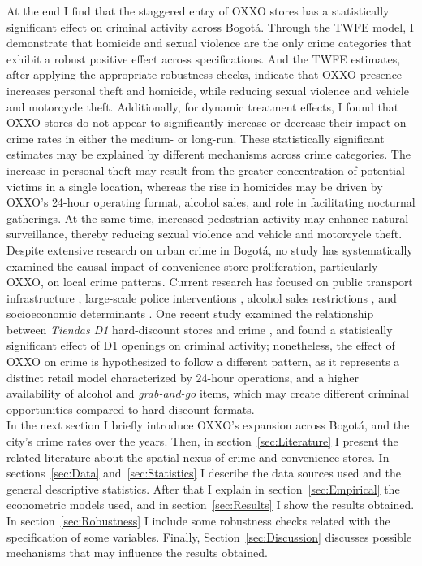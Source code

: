 \documentclass[12pt]{article}
\begin{document}
At the end I find that the staggered entry of OXXO stores has a statistically significant effect on criminal activity across Bogotá. Through the TWFE model, I demonstrate that homicide and sexual violence are the only crime categories that exhibit a robust positive effect across specifications. And the TWFE estimates, after applying the appropriate robustness checks, indicate that OXXO presence increases personal theft and homicide, while reducing sexual violence and vehicle and motorcycle theft. Additionally, for dynamic treatment effects, I found that OXXO stores do not appear to significantly increase or decrease their impact on crime rates in either the medium- or long-run. These statistically significant estimates may be explained by different mechanisms across crime categories. The increase in personal theft may result from the greater concentration of potential victims in a single location, whereas the rise in homicides may be driven by OXXO's 24-hour operating format, alcohol sales, and role in facilitating nocturnal gatherings. At the same time, increased pedestrian activity may enhance natural surveillance, thereby reducing sexual violence and vehicle and motorcycle theft.\\

Despite extensive research on urban crime in Bogotá, no study has systematically examined the causal impact of convenience store proliferation, particularly OXXO, on local crime patterns. Current research has focused on public transport infrastructure \parencite{Bacares2013a,bacares2013impact,Garcia2005}, large-scale police interventions \parencite{Blattman2017,Blattman2021}, alcohol sales restrictions \parencite{Mello2013}, and socioeconomic determinants \parencite{Escobar2012}. One recent study examined the relationship between \textit{Tiendas D1} hard-discount stores and crime \parencite{jaramillo2021low}, and found a statisically significant effect of D1 openings on criminal activity; nonetheless, the effect of OXXO on crime is hypothesized to follow a different pattern, as it  represents a distinct retail model characterized by 24-hour operations, and a higher availability of alcohol and \textit{grab-and-go} items, which may create different criminal opportunities compared to hard-discount formats.\\

In the next section I briefly introduce OXXO’s expansion across Bogotá, and the city’s crime rates over the years. Then, in section~\ref{sec:Literature} I present the related literature about the spatial nexus of crime and convenience stores. In sections~\ref{sec:Data} and~\ref{sec:Statistics} I describe the data sources used and the general descriptive statistics. After that I explain in section~\ref{sec:Empirical} the econometric models used, and in section~\ref{sec:Results} I show the results obtained. In section~\ref{sec:Robustness} I include some robustness checks related with the specification of some variables. Finally, Section~\ref{sec:Discussion}  discusses possible mechanisms that may influence the results obtained.
\end{document}
